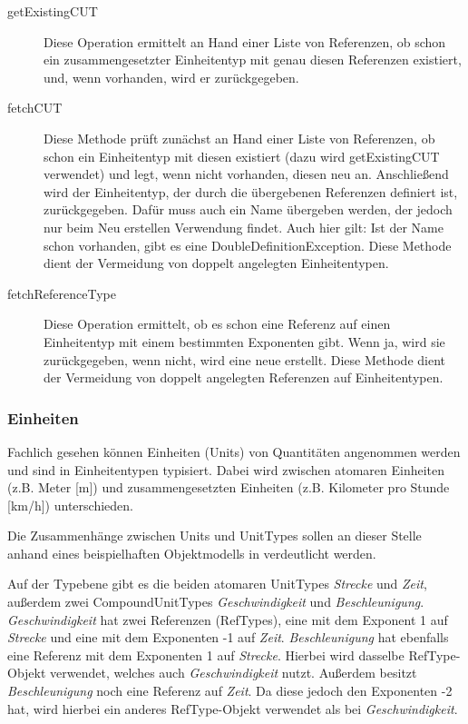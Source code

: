 \begin{description}
\item[getExistingCUT]
Diese Operation ermittelt an Hand einer Liste von Referenzen, ob schon ein zusammengesetzter Einheitentyp mit genau diesen Referenzen existiert, und, wenn vorhanden, wird er zurückgegeben. 
\item[fetchCUT]
Diese Methode prüft zunächst an Hand einer Liste von Referenzen, ob schon ein Einheitentyp mit diesen existiert (dazu wird getExistingCUT verwendet) und legt, wenn nicht vorhanden, diesen neu an. Anschließend wird der Einheitentyp, der durch die übergebenen Referenzen definiert ist, zurückgegeben. Dafür muss auch ein Name übergeben werden, der jedoch nur beim Neu erstellen Verwendung findet. Auch hier gilt: Ist der Name schon vorhanden, gibt es eine DoubleDefinitionException. Diese Methode dient der Vermeidung von doppelt angelegten Einheitentypen.
\item[fetchReferenceType]
Diese Operation ermittelt, ob es schon eine Referenz auf einen Einheitentyp mit einem bestimmten Exponenten gibt. Wenn ja, wird sie zurückgegeben, wenn nicht, wird eine neue erstellt. Diese Methode dient der Vermeidung von doppelt angelegten Referenzen auf Einheitentypen.
\end{description}


\subsubsection{Einheiten}
Fachlich gesehen können Einheiten (Units) von Quantitäten angenommen werden und sind in Einheitentypen typisiert.
Dabei wird zwischen atomaren Einheiten (z.B. Meter [m]) und zusammengesetzten Einheiten (z.B. Kilometer pro Stunde [km/h]) unterschieden.


Die Zusammenhänge zwischen Units und UnitTypes sollen an dieser Stelle anhand eines beispielhaften Objektmodells in  verdeutlicht werden.


Auf der Typebene gibt es die beiden atomaren UnitTypes \textit{Strecke} und \textit{Zeit}, außerdem zwei CompoundUnitTypes \textit{Geschwindigkeit} und \textit{Beschleunigung}. \textit{Geschwindigkeit} hat zwei Referenzen (RefTypes), eine mit dem Exponent 1 auf \textit{Strecke} und eine mit dem Exponenten -1 auf \textit{Zeit}. \textit{Beschleunigung} hat ebenfalls eine Referenz mit dem Exponenten 1 auf \textit{Strecke}. Hierbei wird dasselbe RefType-Objekt verwendet, welches auch \textit{Geschwindigkeit} nutzt. Außerdem besitzt \textit{Beschleunigung} noch eine Referenz auf \textit{Zeit}. Da diese jedoch den Exponenten -2 hat, wird hierbei ein anderes RefType-Objekt verwendet als bei \textit{Geschwindigkeit}.

